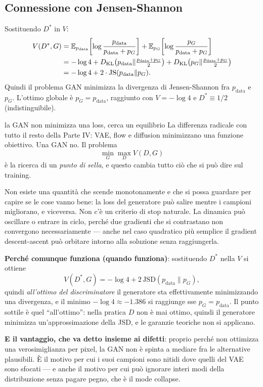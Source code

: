 \subsection{Connessione con Jensen-Shannon}

Sostituendo $D^*$ in $V$:
\begin{align*}
V(D^*, G) &= \mathbb{E}_{p_{\text{data}}}\!\left[\log\frac{p_{\text{data}}}{p_{\text{data}}+p_G}\right] + \mathbb{E}_{p_G}\!\left[\log\frac{p_G}{p_{\text{data}}+p_G}\right]\\
&= -\log 4 + D_{\mathrm{KL}}\!\left(p_{\text{data}} \| \tfrac{p_{\text{data}}+p_G}{2}\right) + D_{\mathrm{KL}}\!\left(p_G \| \tfrac{p_{\text{data}}+p_G}{2}\right)\\
&= -\log 4 + 2 \cdot \mathrm{JS}(p_{\text{data}} \| p_G).
\end{align*}
Quindi il problema GAN minimizza la divergenza di Jensen-Shannon fra $p_{\text{data}}$ e $p_G$. L'ottimo globale è $p_G = p_{\text{data}}$, raggiunto con $V = -\log 4$ e $D^* \equiv 1/2$ (indistinguibile).

\begin{intuizione}{la GAN non minimizza una loss, cerca un equilibrio}
La differenza radicale con tutto il resto della Parte IV: VAE, flow e diffusion minimizzano una funzione obiettivo. Una GAN no. Il problema
\[
\min_G \max_D V(D,G)
\]
è la ricerca di un \emph{punto di sella}, e questo cambia tutto ciò che si può dire sul training.

Non esiste una quantità che scende monotonamente e che si possa guardare per capire se le cose vanno bene: la loss del generatore può salire mentre i campioni migliorano, e viceversa. Non c'è un criterio di stop naturale. La dinamica può oscillare o entrare in ciclo, perché due gradienti che si contrastano non convergono necessariamente — anche nel caso quadratico più semplice il gradient descent-ascent può orbitare intorno alla soluzione senza raggiungerla.

\textbf{Perché comunque funziona (quando funziona)}: sostituendo $D^*$ nella $V$ si ottiene
\[
V(D^*, G) = -\log 4 + 2\, \mathrm{JSD}(p_{\text{data}} \| p_G),
\]
quindi \emph{all'ottimo del discriminatore} il generatore sta effettivamente minimizzando una divergenza, e il minimo $-\log 4 \approx -1.386$ si raggiunge sse $p_G = p_{\text{data}}$. Il punto sottile è quel ``all'ottimo'': nella pratica $D$ non è mai ottimo, quindi il generatore minimizza un'approssimazione della JSD, e le garanzie teoriche non si applicano.

\textbf{E il vantaggio, che va detto insieme ai difetti}: proprio perché non ottimizza una verosimiglianza per pixel, la GAN non è spinta a mediare fra le alternative plausibili. È il motivo per cui i suoi campioni sono nitidi dove quelli del VAE sono sfocati — e anche il motivo per cui può ignorare interi modi della distribuzione senza pagare pegno, che è il mode collapse.
\end{intuizione}

